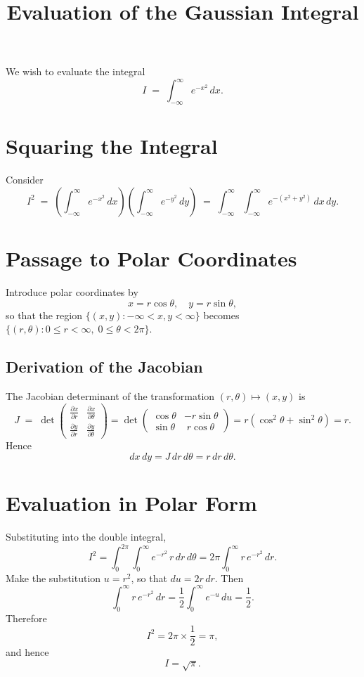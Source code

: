 \documentclass{article}
\title{Evaluation of the Gaussian Integral}
\author{}
\date{}
\begin{document}
\maketitle

We wish to evaluate the integral
\[
I \;=\;\int_{-\infty}^{\infty} e^{-x^2}\,dx.
\]

\section*{Squaring the Integral}
Consider
\[
I^2
\;=\;
\left(\int_{-\infty}^{\infty} e^{-x^2}\,dx\right)
\left(\int_{-\infty}^{\infty} e^{-y^2}\,dy\right)
\;=\;
\int_{-\infty}^{\infty}\int_{-\infty}^{\infty} e^{-(x^2+y^2)}\,dx\,dy.
\]

\section*{Passage to Polar Coordinates}
Introduce polar coordinates by
\[
x = r\cos\theta,\quad
y = r\sin\theta,
\]
so that the region \(\{(x,y)\colon -\infty<x,y<\infty\}\) becomes
\(\{(r,\theta)\colon 0\le r<\infty,\;0\le\theta<2\pi\}\).

\subsection*{Derivation of the Jacobian}
The Jacobian determinant of the transformation \((r,\theta)\mapsto(x,y)\) is
\[
J \;=\;
\det
\begin{pmatrix}
\displaystyle\frac{\partial x}{\partial r} & \displaystyle\frac{\partial x}{\partial \theta} \\[6pt]
\displaystyle\frac{\partial y}{\partial r} & \displaystyle\frac{\partial y}{\partial \theta}
\end{pmatrix}
=
\det
\begin{pmatrix}
\cos\theta & -r\sin\theta \\
\sin\theta & \;r\cos\theta
\end{pmatrix}
=
r(\cos^2\theta+\sin^2\theta)
=
r.
\]
Hence
\[
dx\,dy = J\,dr\,d\theta = r\,dr\,d\theta.
\]

\section*{Evaluation in Polar Form}
Substituting into the double integral,
\[
I^2
=
\int_{0}^{2\pi}\int_{0}^{\infty} e^{-r^2}\,r\,dr\,d\theta
=
2\pi
\int_{0}^{\infty} r\,e^{-r^2}\,dr.
\]
Make the substitution \(u = r^2\), so that \(du = 2r\,dr\). Then
\[
\int_{0}^{\infty} r\,e^{-r^2}\,dr
=
\frac12\int_{0}^{\infty} e^{-u}\,du
=
\frac12.
\]
Therefore
\[
I^2 = 2\pi \times \frac12 = \pi,
\]
and hence
\[
I = \sqrt{\pi}.
\]
\end{document}

